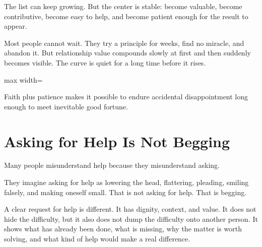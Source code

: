 The list can keep growing. But the center is stable: become valuable, become contributive, become easy to help, and become patient enough for the result to appear.

Most people cannot wait. They try a principle for weeks, find no miracle, and abandon it. But relationship value compounds slowly at first and then suddenly becomes visible. The curve is quiet for a long time before it rises.

\begin{center}
\begin{adjustbox}{max width=\linewidth}
\end{adjustbox}
\end{center}

Faith plus patience makes it possible to endure accidental disappointment long enough to meet inevitable good fortune.

\section*{Asking for Help Is Not Begging}

Many people misunderstand help because they misunderstand asking.

They imagine asking for help as lowering the head, flattering, pleading, smiling falsely, and making oneself small. That is not asking for help. That is begging.

A clear request for help is different. It has dignity, context, and value. It does not hide the difficulty, but it also does not dump the difficulty onto another person. It shows what has already been done, what is missing, why the matter is worth solving, and what kind of help would make a real difference.

